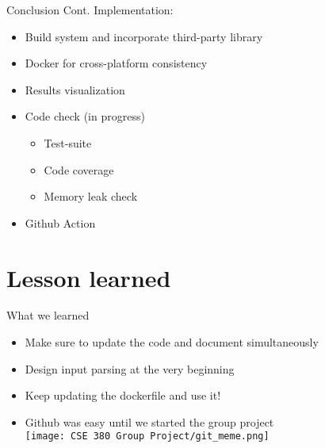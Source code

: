 \documentclass{beamer}
\begin{document}
\begin{frame}{Conclusion Cont.}
     Implementation:
    \begin{itemize}
        \item Build system and incorporate third-party library
        \item Docker for cross-platform consistency
        \item Results visualization
        \item Code check (in progress) \begin{itemize}
            \item Test-suite
            \item Code coverage
            \item Memory leak check
        \end{itemize}
        \item Github Action
    \end{itemize}
    
\end{frame}

\section{Lesson learned}
\begin{frame}{What we learned}
    \begin{itemize}
        \item Make sure to update the code and document simultaneously 
        \item Design input parsing at the very beginning
        \item Keep updating the dockerfile and use it!
        \item Github was easy until we started the group project\\
        \centering
        \texttt{[image: CSE 380 Group Project/git\_meme.png]}  
        
        
    \end{itemize}
\end{frame}
\end{document}
